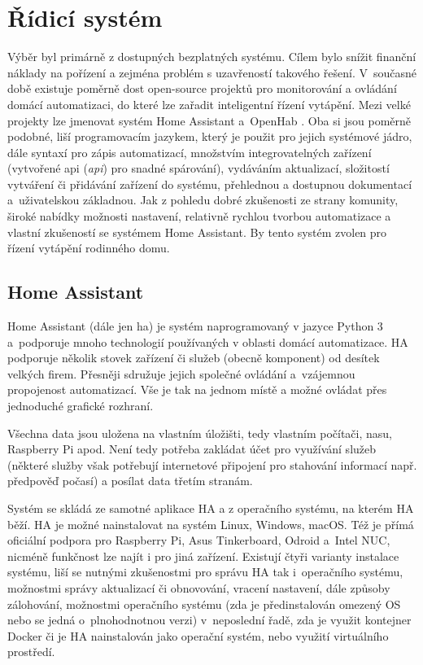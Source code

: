 \section{Řídicí systém}

Výběr byl primárně z dostupných bezplatných systému. Cílem bylo snížit finanční náklady na pořízení a zejména problém s uzavřeností takového řešení. V~současné době existuje poměrně dost open-source projektů pro monitorování a ovládání domácí automatizaci, do které lze zařadit inteligentní řízení vytápění. Mezi velké projekty lze jmenovat systém Home Assistant \cite{home-assistant} a~OpenHab \cite{openhab}. Oba si jsou poměrně podobné, liší programovacím jazykem, který je použit pro jejich systémové jádro, dále syntaxí pro zápis automatizací, množstvím integrovatelných zařízení (vytvořené \acrshort{api} (\textit{\acrlong{api}}) pro snadné spárování), vydáváním aktualizací, složitostí vytváření či přidávání zařízení do systému, přehlednou a dostupnou dokumentací a~uživatelskou základnou. Jak z pohledu dobré zkušenosti ze strany komunity, široké nabídky možnosti nastavení, relativně rychlou tvorbou automatizace a vlastní zkušeností se systémem Home Assistant. By tento systém zvolen pro řízení vytápění rodinného domu.

\subsection{Home Assistant}
Home Assistant (dále jen \acrshort{ha}) je systém naprogramovaný v jazyce Python 3 a~podporuje mnoho technologií používaných v oblasti domácí automatizace. HA podporuje několik stovek zařízení či služeb (obecně komponent) od desítek velkých firem. Přesněji sdružuje jejich společné ovládání a~vzájemnou propojenost automatizací. Vše je tak na jednom místě a možné ovládat přes jednoduché grafické rozhraní.

Všechna data jsou uložena na vlastním úložišti, tedy vlastním počítači, nasu, Raspberry Pi apod. Není tedy potřeba zakládat účet pro využívání služeb (některé služby však potřebují internetové připojení pro stahování informací např. předpověď počasí) a posílat data třetím stranám.

Systém se skládá ze samotné aplikace HA a z operačního systému, na kterém HA běží. HA je možné nainstalovat na systém Linux, Windows, macOS. Též je přímá oficiální podpora pro Raspberry Pi, Asus Tinkerboard, Odroid a~Intel NUC, nicméně funkčnost lze najít i pro jiná zařízení. Existují čtyři varianty instalace systému, liší se nutnými zkušenostmi pro správu HA tak i~operačního systému, možnostmi správy aktualizací či obnovování, vracení nastavení, dále způsoby zálohování, možnostmi operačního systému (zda je předinstalován omezený OS nebo se jedná o~plnohodnotnou verzi) v~neposlední řadě, zda je využit kontejner Docker či je HA nainstalován jako operační systém, nebo využití virtuálního prostředí.

